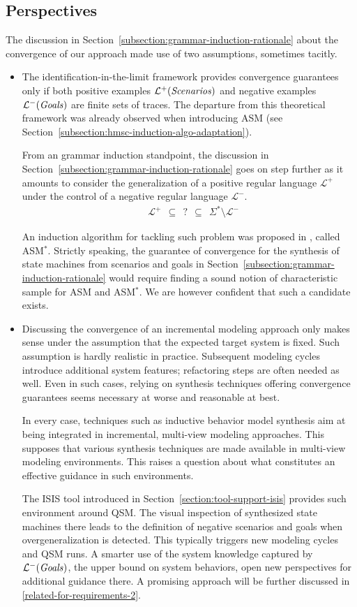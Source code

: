 \subsection{Perspectives}

The discussion in Section~\ref{subsection:grammar-induction-rationale} about the convergence of our approach made use of two assumptions, sometimes tacitly.
\begin{itemize}
\item The identification-in-the-limit framework provides convergence guarantees only if both positive examples $\mathcal{L}^+(\mbox{\emph{Scenarios}})$ and negative examples $\mathcal{L}^-(\mbox{\emph{Goals}})$ are finite sets of traces. The departure from this theoretical framework was already observed when introducing ASM (see Section~\ref{subsection:hmsc-induction-algo-adaptation}). 

From an grammar induction standpoint, the discussion in Section~\ref{subsection:grammar-induction-rationale} goes on step further as it amounts to consider the generalization of a positive regular language $\mathcal{L}^+$ under the control of a negative regular language $\mathcal{L}^-$.
\begin{align*}
&\mathcal{L}^+~~\subseteq~~?~~\subseteq~~\Sigma^* \setminus \mathcal{L}^-
\end{align*}

An induction algorithm for tackling such problem was proposed in \cite{Lambeau:2008}, called ASM$^*$. Strictly speaking, the guarantee of convergence for the synthesis of state machines from scenarios and goals in Section~\ref{subsection:grammar-induction-rationale} would require finding a sound notion of characteristic sample for ASM and ASM$^*$. We are however confident that such a candidate exists.

\item Discussing the convergence of an incremental modeling approach only makes sense under the assumption that the expected target system is fixed. Such assumption is hardly realistic in practice. Subsequent modeling cycles introduce additional system features; refactoring steps are often needed as well. Even in such cases, relying on synthesis techniques offering convergence guarantees seems necessary at worse and reasonable at best.

In every case, techniques such as inductive behavior model synthesis aim at being integrated in incremental, multi-view modeling approaches. This supposes that various synthesis techniques are made available in multi-view modeling environments. This raises a question about what constitutes an effective guidance in such environments.

The ISIS tool introduced in Section~\ref{section:tool-support-isis} provides such environment around QSM. The visual inspection of synthesized state machines there leads to the definition of negative scenarios and goals when overgeneralization is detected. This typically triggers new modeling cycles and QSM runs. A smarter use of the system knowledge captured by $\mathcal{L}^-(\mbox{\emph{Goals}})$, the upper bound on system behaviors, open new perspectives for additional guidance there. A promising approach will be further discussed in \ref{related-for-requirements-2}.
\end{itemize}
